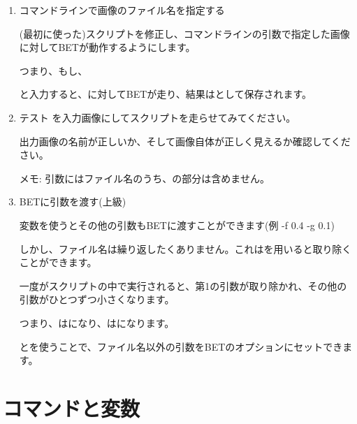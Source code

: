 \documentclass{jsarticle}
\begin{document}
\begin{enumerate}
\item コマンドラインで画像のファイル名を指定する

(最初に使った){\color{red}}スクリプトを修正し、コマンドラインの引数で指定した画像に対してBETが動作するようにします。

\bigskip

つまり、もし、{\color{red}}

と入力すると、{\color{red}}に対してBETが走り、結果は{\color{red}}として保存されます。

\item テスト
{\color{red}}を入力画像にしてスクリプトを走らせてみてください。

出力画像の名前が正しいか、そして画像自体が正しく見えるか確認してください。

メモ: 引数にはファイル名のうち、{\color{red}}の部分は含めません。

\item BETに引数を渡す(上級)

変数{\color{red}{\tt \$@}}を使うとその他の引数もBETに渡すことができます(例  -f 0.4 -g 0.1)

しかし、ファイル名は繰り返したくありません。これは{\color{red}}を用いると取り除くことができます。

一度{\color{red}}がスクリプトの中で実行されると、第1の引数{\color{red}{\tt \$1}}が取り除かれ、その他の引数がひとつずつ小さくなります。

つまり、{\color{red}{\tt \$2}}は{\color{red}{\tt \$1}}になり、{\color{red}{\tt \$3}}は{\color{red}{\tt \$2}}になります。

{\color{red}}と{\color{red}{\tt \$@}}を使うことで、ファイル名以外の引数をBETのオプションにセットできます。

\end{enumerate}

\section{コマンドと変数}
\end{document}
